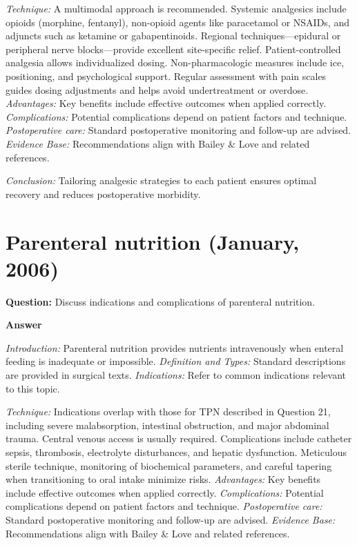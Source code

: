 \documentclass{article}
\begin{document}
\emph{Technique:} A multimodal approach is recommended. Systemic analgesics include opioids (morphine, fentanyl), non-opioid agents like paracetamol or NSAIDs, and adjuncts such as ketamine or gabapentinoids. Regional techniques—epidural or peripheral nerve blocks—provide excellent site-specific relief. Patient-controlled analgesia allows individualized dosing. Non-pharmacologic measures include ice, positioning, and psychological support. Regular assessment with pain scales guides dosing adjustments and helps avoid undertreatment or overdose.
\emph{Advantages:} Key benefits include effective outcomes when applied correctly.
\emph{Complications:} Potential complications depend on patient factors and technique.
\emph{Postoperative care:} Standard postoperative monitoring and follow-up are advised.
\emph{Evidence Base:} Recommendations align with Bailey & Love and related references.

\emph{Conclusion:} Tailoring analgesic strategies to each patient ensures optimal recovery and reduces postoperative morbidity.


\section{Parenteral nutrition (January, 2006)}

\textbf{Question:} Discuss indications and complications of parenteral nutrition.

\textbf{Answer}

\emph{Introduction:} Parenteral nutrition provides nutrients intravenously when enteral feeding is inadequate or impossible.
\emph{Definition and Types:} Standard descriptions are provided in surgical texts.
\emph{Indications:} Refer to common indications relevant to this topic.

\emph{Technique:} Indications overlap with those for TPN described in Question 21, including severe malabsorption, intestinal obstruction, and major abdominal trauma. Central venous access is usually required. Complications include catheter sepsis, thrombosis, electrolyte disturbances, and hepatic dysfunction. Meticulous sterile technique, monitoring of biochemical parameters, and careful tapering when transitioning to oral intake minimize risks.
\emph{Advantages:} Key benefits include effective outcomes when applied correctly.
\emph{Complications:} Potential complications depend on patient factors and technique.
\emph{Postoperative care:} Standard postoperative monitoring and follow-up are advised.
\emph{Evidence Base:} Recommendations align with Bailey & Love and related references.
\end{document}
